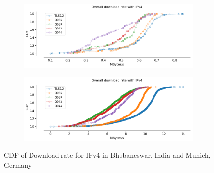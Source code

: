 \begin{frame}

\begin{figure}[!htb]
    
    \begin{subfigure}{0.5\textwidth}
        \includegraphics[width=\linewidth]{./plots/youtube/india/graph_download_rate.png}
    \end{subfigure}
    \begin{subfigure}{0.5\textwidth}
        \includegraphics[width=\linewidth]{./plots/youtube/munich/graph_download_rate.png}
    \end{subfigure}    
    \caption{CDF of Download rate for IPv4 in Bhubaneswar, India and Munich, Germany}\label{fig:cdf-of-download}
\end{figure}

\end{frame}
\clearpage

